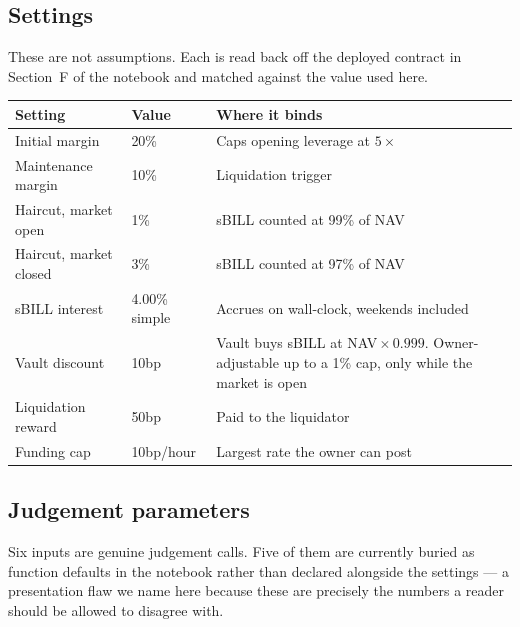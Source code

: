 \documentclass[11pt,a4paper]{article}
\begin{document}
\subsection{Settings}

These are not assumptions. Each is read back off the deployed contract in Section~F
of the notebook and matched against the value used here.

\begin{center}
\small
\begin{tabular}{@{}p{5.4cm}p{2.2cm}p{7.4cm}@{}}
\toprule
\textbf{Setting} & \textbf{Value} & \textbf{Where it binds} \\
\midrule
Initial margin & 20\% & Caps opening leverage at $5\times$ \\
Maintenance margin & 10\% & Liquidation trigger \\
Haircut, market open & 1\% & sBILL counted at 99\% of NAV \\
Haircut, market closed & 3\% & sBILL counted at 97\% of NAV \\
sBILL interest & 4.00\% simple & Accrues on wall-clock, weekends included \\
Vault discount & 10bp & Vault buys sBILL at NAV${}\times0.999$. Owner-adjustable up to a 1\% cap, only while the market is open \\
Liquidation reward & 50bp & Paid to the liquidator \\
Funding cap & 10bp/hour & Largest rate the owner can post \\
\bottomrule
\end{tabular}
\end{center}

\subsection{Judgement parameters}

Six inputs are genuine judgement calls. Five of them are currently buried as function
defaults in the notebook rather than declared alongside the settings — a presentation
flaw we name here because these are precisely the numbers a reader should be allowed to
disagree with.
\end{document}
